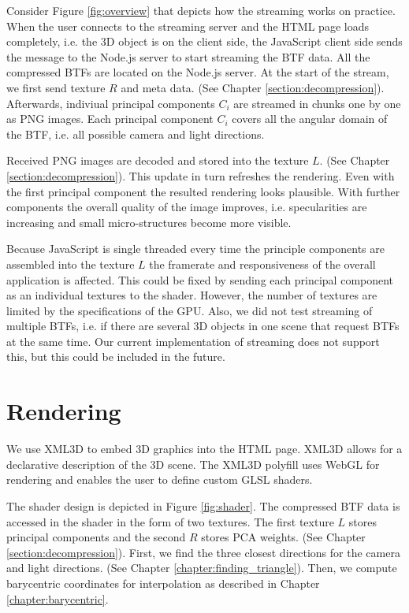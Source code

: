 Consider Figure \ref{fig:overview} that depicts how the streaming works on practice.
When the user connects to the streaming server and the HTML page loads completely, 
i.e. the 3D object is on the client side, the JavaScript client side sends the message to the Node.js server to start streaming the BTF data.
All the compressed BTFs are located on the Node.js server.
At the start of the stream, we first send texture $R$ and meta data. (See Chapter  \ref{section:decompression}).
Afterwards, indiviual principal components $C_{i}$ are streamed in chunks one by one as PNG images.
Each principal component $C_{i}$ covers all the angular domain of the BTF, i.e. all possible camera and light directions.

Received PNG images are decoded and stored into the texture $L$. (See Chapter  \ref{section:decompression}).
This update in turn refreshes the rendering.
Even with the first principal component the resulted rendering looks plausible.
With further components the overall quality of the image improves, i.e. specularities are increasing and small micro-structures become more visible.


Because JavaScript is single threaded every time the principle components are assembled into the texture $L$ the framerate and responsiveness of the overall application is affected.
This could be fixed by sending each  principal component as an individual textures to the shader.
However, the number of textures are limited by the specifications of the GPU.
Also, we did not test streaming of multiple BTFs, i.e. if there are several 3D objects in one scene that request BTFs at the same time.
 Our current implementation of streaming does not support this, but this could be included in the future.
 
 
\section{Rendering}
\label{section:impl_rendering}


We use XML3D \cite{xml3d} to embed 3D graphics into the HTML page. XML3D allows for a declarative description of the 3D scene.
The XML3D polyfill uses WebGL for rendering and enables the user to define custom GLSL shaders.

The shader design is depicted in Figure \ref{fig:shader}.
The compressed BTF data is accessed in the shader in the form of two textures. 
The first texture $L$ stores principal components and the second $R$ stores PCA weights. (See Chapter \ref{section:decompression}).
First, we find the three closest directions for the camera and light directions. (See Chapter \ref{chapter:finding_triangle}).
Then, we compute barycentric coordinates for interpolation as described in Chapter \ref{chapter:barycentric}.

